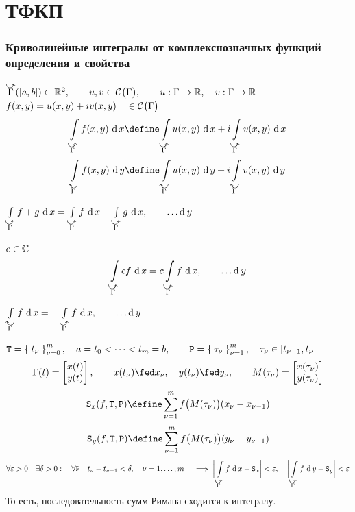\part{ТФКП}

\section{Криволинейные интегралы от комплекснозначных функций  определения и свойства}

\begin{definition}
	$ \curvedir \Gamma([a, b]) \sub \R^2, \qquad u, v \in \Cont \Gamma, \qquad u : \Gamma \to \R, \quad v : \Gamma \to \R $ \\
	$ f(x, y) = u(x, y) + iv(x, y) \quad \in \Cont \Gamma $
	$$ \cint[x]{\curvedir \Gamma}{f(x, y)} \define \cint[x]{\curvedir \Gamma}{u(x, y)} + i \cint[x]{\curvedir \Gamma}{v(x, y)} $$
	$$ \cint[y]{\curvedir[0] \Gamma}{f(x, y)} \define \cint[y]{\curvedir[0] \Gamma}{u(x, y)} + i \cint[y]{\curvedir[0] \Gamma}{v(x, y)} $$
\end{definition}

\begin{props}
	\item $ \cint[x]{\curvedir \Gamma}{f + g} = \cint[x]{\curvedir \Gamma}f + \cint[x]{\curvedir \Gamma}g, \qquad \dots \di y $
	\item $ c \in \Co $
	$$ \cint[x]{\curvedir \Gamma}{cf} = c \cint[x]{\curvedir \Gamma}f, \qquad \dots \di y $$
	\item $ \cint[x]{\curvedir[0] \Gamma}f = - \cint[x]{\curvedir \Gamma}f, \qquad \dots \di y $
	\item $ \mathtt T = \seqz[m]{t_\nu}\nu, \quad a = t_0 < \dots < t_m = b, \qquad \mathtt P = \seq[m]{\tau_\nu}\nu, \quad \tau_\nu \in [t_{\nu - 1}, t_\nu] $
	$$ \Gamma(t) =
	\begin{bmatrix}
		x(t) \\
		y(t)
	\end{bmatrix}, \qquad x(t_\nu) \fed x_\nu, \quad y(t_\nu) \fed y_\nu, \qquad M(\tau_\nu) =
	\begin{bmatrix}
		x(\tau_\nu) \\
		y(\tau_\nu)
	\end{bmatrix} $$
	$$ \mathtt S_x(f, \mathtt T, \mathtt P) \define \sum_{\nu = 1}^m f \big( M(\tau_\nu) \big) (x_\nu - x_{\nu - 1}) $$
	$$ \mathtt S_y(f, \mathtt T, \mathtt P) \define \sum_{\nu = 1}^m f \big( M(\tau_\nu) \big) (y_\nu - y_{\nu - 1}) $$
	$$ \forall \eps > 0 \quad \exists \delta > 0 : \quad \forall \mathtt P \quad t_\nu - t_{\nu - 1} < \delta, \quad \nu = 1, \dots, m \quad \implies \bigg| \cint[x]{\curvedir\Gamma}f - \mathtt S_x \bigg| < \eps, \quad \bigg| \cint[y]{\curvedir\Gamma}f - \mathtt S_y \bigg| < \eps $$
	То есть, последовательность сумм Римана сходится к интегралу.
\end{props}

